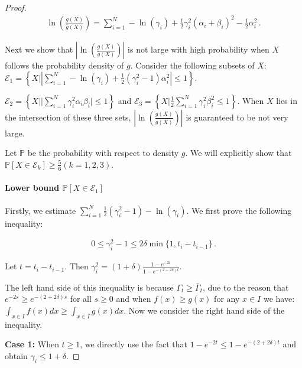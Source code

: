 \documentclass{article}
\theoremstyle{definition}
\begin{document}
\begin{proof}
\begin{align*}
\ln\left(\frac{g(X)}{\bar{g}(X)}\right)=\sum_{i=1}^{N}-\ln(\gamma_{i})+\frac{1}{2}\gamma^{2}_{i}(\alpha_{i}+\beta_{i})^{2}-\frac{1}{2}\alpha_{i}^{2}\,.
\end{align*}

Next we show that $\left\vert \ln\left(\frac{g(X)}{\bar{g}(X)}\right)\right\vert$ is not large with high probability when $X$ follows the probability density of $g$. Consider the following subsets of $X$: $\mathcal{E}_{1}=\left\{X\big\vert \left\vert\sum_{i=1}^{N}-\ln(\gamma_{i})+\frac{1}{2}(\gamma^{2}_{i}-1)\alpha_{i}^{2}  \right\vert\leq 1   \right\}$.

$\mathcal{E}_{2}=\left\{ X\big\vert \vert \sum_{i=1}^{N} \gamma_{i}^{2}\alpha_{i}\beta_{i}\vert\leq 1 \right\}$
and 
$\mathcal{E}_{3}=\left\{X\big\vert \frac{1}{2}\sum_{i=1}^{N}\gamma^{2}_{i}\beta^{2}_{i}\leq 1 \right\}$.
When $X$ lies in the intersection of these three sets, $\left\vert \ln\left(\frac{g(X)}{\bar{g}(X)}\right)\right\vert$ is guaranteed to be not very large.

Let $\mathbb{P}$ be the probability with respect to density $g$. We will explicitly show that $\mathbb{P}[X\in\mathcal{E}_{k}]\geq \frac{5}{6}(k=1,2,3)$.

\paragraph{Lower bound $\mathbb{P}[X\in\mathcal{E}_{1}]$}

Firstly, we estimate $\sum_{i=1}^{N}\frac{1}{2}(\gamma^{2}_{i}-1)-\ln(\gamma_{i})$. We first prove the following inequality:

\begin{align}
0\leq \gamma^{2}_{i}-1\leq 2\delta\min\{1,t_{i}-t_{i-1}\}\,.
\end{align}

Let $t=t_{i}-t_{i-1}$. Then $\gamma^{2}_{i}=(1+\delta)\frac{1-e^{-2t}}{1-e^{-(2+2\delta)t}}$.

The left hand side of this inequality is because $\Gamma_{t}\geq \bar{\Gamma}_{t}$, due to the reason that $e^{-2s}\geq e^{-(2+2\delta)s}$ for all $s\geq 0$ and when $f(x)\geq g(x)$ for any $x\in I$ we have: $\int_{x\in I}f(x)dx\geq \int_{x\in I}g(x)dx$. Now we consider the right hand side of the inequality.

\textbf{Case 1:} When $t\geq 1$, we directly use the fact that $1-e^{-2t}\leq 1-e^{-(2+2\delta)t}$ and obtain $\gamma_{i}\leq 1+\delta$.


\end{proof}
\end{document}
